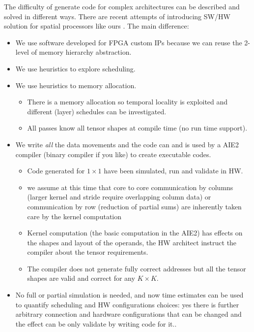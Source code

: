 \documentclass[conference]{IEEEtran}
\begin{document}
The difficulty of generate code for complex architectures can be
described and solved in different ways. There are recent attempts of
introducing SW/HW solution for spatial processors like ours
\cite{Huang2021CoSASB,Russo2023MemoryAwareDA,Cai2023InterlayerSS}. The
main difference:
\begin{itemize}
   \item We use software developed for FPGA custom IPs because we can
     reuse the 2-level of memory hierarchy abstraction.
   \item We use heuristics to explore scheduling.
   \item We use heuristics to memory allocation.
     \begin{itemize}
     \item There is a memory allocation so temporal locality is
       exploited and different (layer) schedules can be investigated.
     \item All passes know all tensor shapes at compile time (no run
       time support).
     \end{itemize}
   \item We write {\em all} the data movements and the code can and is
     used by a AIE2 compiler (binary compiler if you like) to create
     executable codes.
     \begin{itemize}
     \item Code generated for $1\times 1$ have been simulated, run and
       validate in HW.
     \item we assume at this time that core to core communication by
       columns (larger kernel and stride require overlapping column
       data) or communication by row (reduction of partial sums) are
       inherently taken care by the kernel computation
     \item Kernel computation (the basic computation in the AIE2) has
       effects on the shapes and layout of the operands, the HW
       architect instruct the compiler about the tensor requirements. 
     \item The compiler does not generate fully correct addresses but
       all the tensor shapes are valid and correct for any $K\times K$.
     \end{itemize}
   \item No full or partial simulation is needed, and now time
     estimates can be used to quantify scheduling and HW
     configurations choices: yes there is further arbitrary connection
     and hardware configurations that can be changed and the effect
     can be only validate by writing code for it..
\end{itemize}
     
\end{document}

